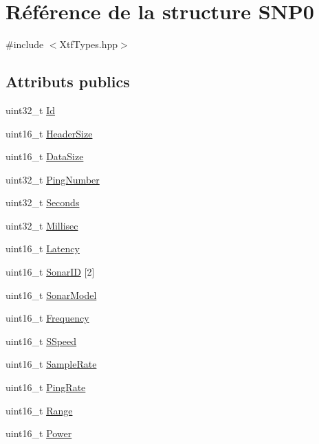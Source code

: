 \hypertarget{structSNP0}{}\section{Référence de la structure S\+N\+P0}
\label{structSNP0}


{\ttfamily \#include $<$Xtf\+Types.\+hpp$>$}

\subsection*{Attributs publics}
\begin{DoxyCompactItemize}
\item 
uint32\+\_\+t \hyperlink{structSNP0_ab0014708aadf0ad4b1a26ccef2191c24}{Id}
\item 
uint16\+\_\+t \hyperlink{structSNP0_a948d2af915700abd82c6c725da30c8a2}{Header\+Size}
\item 
uint16\+\_\+t \hyperlink{structSNP0_a40fa21d4ffa7a3e3beb0bc1c863eaa93}{Data\+Size}
\item 
uint32\+\_\+t \hyperlink{structSNP0_aea1f45b21957092849539ae85caeabba}{Ping\+Number}
\item 
uint32\+\_\+t \hyperlink{structSNP0_a0e5af36fb4c4a7ad4991d0fee39849f0}{Seconds}
\item 
uint32\+\_\+t \hyperlink{structSNP0_afd37fe6d7e52b61a9d011902b6742c19}{Millisec}
\item 
uint16\+\_\+t \hyperlink{structSNP0_af63465612e6fbbbd00438aa4fd407111}{Latency}
\item 
uint16\+\_\+t \hyperlink{structSNP0_ae80fe309155e6ca399ad5d4e3eb71ad9}{Sonar\+ID} \mbox{[}2\mbox{]}
\item 
uint16\+\_\+t \hyperlink{structSNP0_ad140e764420ebcdfdfe86e6b22045d70}{Sonar\+Model}
\item 
uint16\+\_\+t \hyperlink{structSNP0_a20f0a2401ebc774d708b7bbfaf9a891f}{Frequency}
\item 
uint16\+\_\+t \hyperlink{structSNP0_a34acd7f87f72ec98e040260e54fac986}{S\+Speed}
\item 
uint16\+\_\+t \hyperlink{structSNP0_aa2d1893b43ba99412fcf0c8a84f70e2b}{Sample\+Rate}
\item 
uint16\+\_\+t \hyperlink{structSNP0_a896fe8fc11f848e0e8fe1cb07ec465d2}{Ping\+Rate}
\item 
uint16\+\_\+t \hyperlink{structSNP0_ac2fa52ce9ce23989f60a52eea9570f8e}{Range}
\item 
uint16\+\_\+t \hyperlink{structSNP0_a1ee6f80141df06590712bc77aa6dcb85}{Power}

\end{DoxyCompactItemize}
